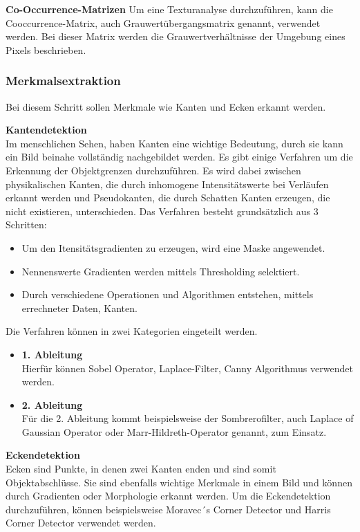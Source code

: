     \textbf{Co-Occurrence-Matrizen}
    Um eine Texturanalyse durchzuführen, kann die Cooccurrence-Matrix\cite{seg_coocc}, auch Grauwertübergangsmatrix genannt, verwendet werden. 
    Bei dieser Matrix werden die Grauwertverhältnisse der Umgebung eines Pixels beschrieben.

    \subsubsection{Merkmalsextraktion}
    Bei diesem Schritt sollen Merkmale wie Kanten und Ecken erkannt werden.

    \textbf{Kantendetektion}\\
    Im menschlichen Sehen, haben Kanten eine wichtige Bedeutung, durch sie kann ein Bild beinahe vollständig nachgebildet werden. Es gibt einige Verfahren um die Erkennung der Objektgrenzen durchzuführen. Es wird dabei zwischen physikalischen Kanten, die durch inhomogene Intensitätswerte bei Verläufen erkannt werden und Pseudokanten, die durch Schatten Kanten erzeugen, die nicht existieren, unterschieden.
    Das Verfahren besteht grundsätzlich aus 3 Schritten\cite{Bildverarbeitung}:
    \begin{itemize}
        \item Um den Itensitätsgradienten zu erzeugen, wird eine Maske angewendet.
        \item Nennenswerte Gradienten werden mittels Thresholding selektiert.
        \item Durch verschiedene Operationen und Algorithmen entstehen, mittels errechneter Daten, Kanten.
    \end{itemize}
    Die Verfahren können in zwei Kategorien eingeteilt werden.
    \begin{itemize}
        \item \textbf{1. Ableitung}\\
        Hierfür können Sobel Operator, Laplace-Filter, Canny Algorithmus verwendet werden.
        \item \textbf{2. Ableitung}\\
        Für die 2. Ableitung kommt beispielsweise der Sombrerofilter, auch Laplace of Gaussian Operator oder Marr-Hildreth-Operator genannt, zum Einsatz.
    \end{itemize}
    \textbf{Eckendetektion}\\
    Ecken sind Punkte, in denen zwei Kanten enden und sind somit Objektabschlüsse. Sie sind ebenfalls wichtige Merkmale in einem Bild und können durch Gradienten oder Morphologie erkannt werden. Um die Eckendetektion durchzuführen, können beispielsweise Moravec´s Corner Detector und Harris Corner Detector verwendet werden. 


